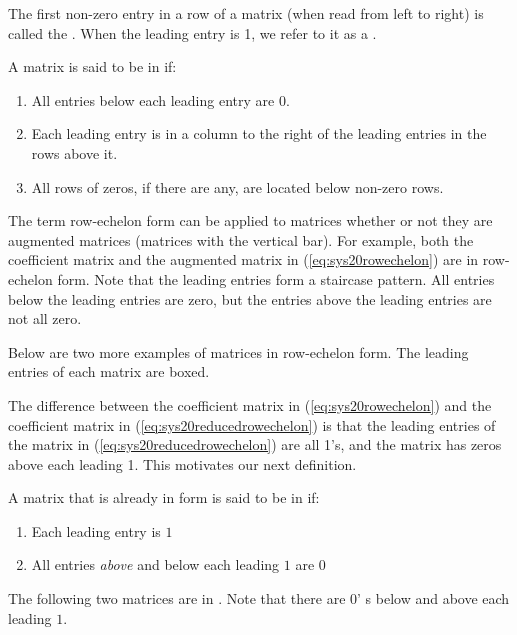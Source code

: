 \documentclass{ximera}
\begin{document}
\begin{definition}\label{def:leadentry} The first non-zero entry in a row of a matrix (when read from left to right) is called the .  When the leading entry is 1, we refer to it as a .
\end{definition}

\begin{definition}\label{def:ref}
A matrix is said to be in  if:
\begin{enumerate}
\item All entries below each leading entry are 0.
\item Each leading entry is in a column to the right of the leading entries in the rows above it.
\item All rows of zeros, if there are any, are located below non-zero rows.
\end{enumerate}
\end{definition}

The term row-echelon form can be applied to matrices whether or not they are augmented matrices (matrices with the vertical bar). For example, both the coefficient matrix and the augmented matrix in (\ref{eq:sys20rowechelon}) are in row-echelon form.  Note that the leading entries form a staircase pattern. All entries below the leading entries are zero, but the entries above the leading entries are not all zero.

Below are two more examples of matrices in row-echelon form.  The leading entries of each matrix are boxed.
 
 

The difference between the coefficient matrix in  (\ref{eq:sys20rowechelon}) and the coefficient matrix in (\ref{eq:sys20reducedrowechelon}) is that the leading entries of the  matrix in (\ref{eq:sys20reducedrowechelon}) are all 1's, and the matrix has zeros above each leading 1.  This motivates our next definition.

\begin{definition}\label{def:rref}
A matrix that is already in  form is said to be in  if:
\begin{enumerate}
\item Each leading entry is $1$
\item All entries {\it above} and below each leading $1$ are $0$
\end{enumerate}
\end{definition}
The following two matrices are in .  Note that there are $0$'
s below and above each leading $1$.
\end{document}
